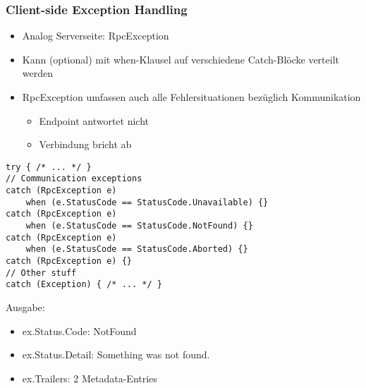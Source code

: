 \begin{multicols*}{2}
\subsubsection{Client-side Exception Handling}
\begin{itemize}
    \item Analog Serverseite: RpcException
    \item Kann (optional) mit when-Klausel auf verschiedene Catch-Blöcke verteilt werden
    \item RpcException umfassen auch alle Fehlersituationen bezüglich Kommunikation
    \begin{itemize}
        \item Endpoint antwortet nicht
        \item Verbindung bricht ab
    \end{itemize}
\end{itemize}
\begin{lstlisting}
try { /* ... */ }
// Communication exceptions
catch (RpcException e)
    when (e.StatusCode == StatusCode.Unavailable) {}
catch (RpcException e)
    when (e.StatusCode == StatusCode.NotFound) {}
catch (RpcException e)
    when (e.StatusCode == StatusCode.Aborted) {}
catch (RpcException e) {}
// Other stuff
catch (Exception) { /* ... */ }
\end{lstlisting}
Ausgabe:
\begin{itemize}
    \item ex.Status.Code: NotFound
    \item ex.Status.Detail: Something was not found.
    \item ex.Trailers: 2 Metadata-Entries
\end{itemize}

\end{multicols*}